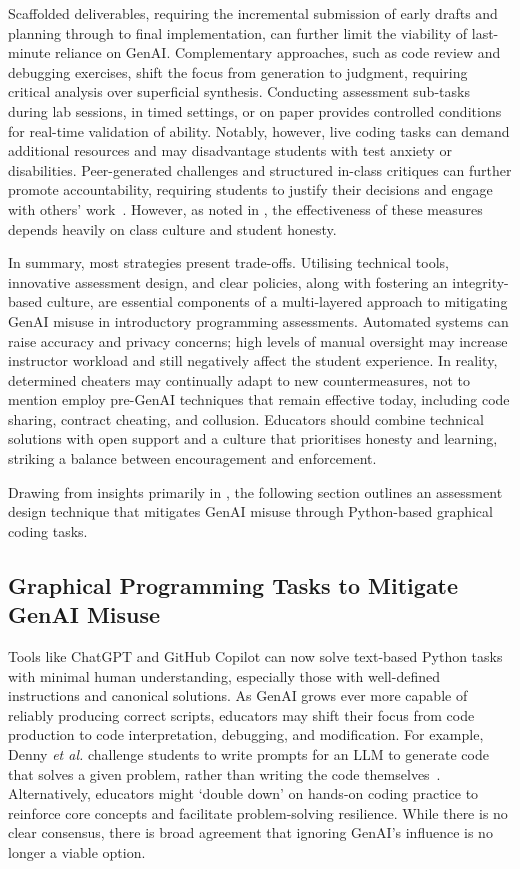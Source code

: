 Scaffolded deliverables, requiring the incremental submission of early drafts and planning through to final implementation, can further limit the viability of last-minute reliance on GenAI. Complementary approaches, such as code review and debugging exercises, shift the focus from generation to judgment, requiring critical analysis over superficial synthesis. Conducting assessment sub-tasks during lab sessions, in timed settings, or on paper provides controlled conditions for real-time validation of ability. Notably, however, live coding tasks can demand additional resources and may disadvantage students with test anxiety or disabilities. Peer-generated challenges and structured in-class critiques can further promote accountability, requiring students to justify their decisions and engage with others' work~\cite{beaton_instructional_2024}. However, as noted in , the effectiveness of these measures depends heavily on class culture and student honesty.

In summary, most strategies present trade-offs. Utilising technical tools, innovative assessment design, and clear policies, along with fostering an integrity-based culture, are essential components of a multi-layered approach to mitigating GenAI misuse in introductory programming assessments. Automated systems can raise accuracy and privacy concerns; high levels of manual oversight may increase instructor workload and still negatively affect the student experience. In reality, determined cheaters may continually adapt to new countermeasures, not to mention employ pre-GenAI techniques that remain effective today, including code sharing, contract cheating, and collusion. Educators should combine technical solutions with open support and a culture that prioritises honesty and learning, striking a balance between encouragement and enforcement.

Drawing from insights primarily in , the following section outlines an assessment design technique that mitigates GenAI misuse through Python-based graphical coding tasks.

\subsection{Graphical Programming Tasks to Mitigate GenAI Misuse}

Tools like ChatGPT and GitHub Copilot can now solve text-based Python tasks with minimal human understanding, especially those with well-defined instructions and canonical solutions. As GenAI grows ever more capable of reliably producing correct scripts, educators may shift their focus from code production to code interpretation, debugging, and modification. For example, Denny \textit{et al.} challenge students to write prompts for an LLM to generate code that solves a given problem, rather than writing the code themselves~\cite{denny_prompt_2024}. Alternatively, educators might `double down' on hands-on coding practice to reinforce core concepts and facilitate problem-solving resilience. While there is no clear consensus, there is broad agreement that ignoring GenAI's influence is no longer a viable option.

